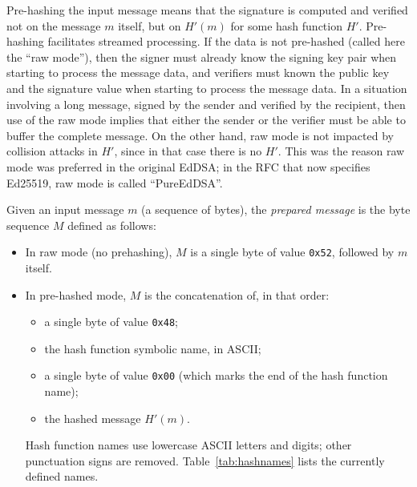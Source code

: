 \documentclass{llncs}
\begin{document}
Pre-hashing the input message means that the signature is computed and
verified not on the message $m$ itself, but on $H'(m)$ for some hash
function $H'$. Pre-hashing facilitates streamed processing. If the data
is not pre-hashed (called here the ``raw mode''), then the signer must
already know the signing key pair when starting to process the message
data, and verifiers must known the public key and the signature value
when starting to process the message data. In a situation involving a
long message, signed by the sender and verified by the recipient, then
use of the raw mode implies that either the sender or the verifier must
be able to buffer the complete message. On the other hand, raw mode is
not impacted by collision attacks in $H'$, since in that case there is
no $H'$. This was the reason raw mode was preferred in the original
EdDSA\cite{BerDuiLanSchYan2012}; in the RFC that now specifies
Ed25519\cite{EdDSArfc8032}, raw mode is called ``PureEdDSA''.

Given an input message $m$ (a sequence of bytes), the \emph{prepared
message} is the byte sequence $M$ defined as follows:
\begin{itemize}

    \item In raw mode (no prehashing), $M$ is a single byte of value
    \verb+0x52+, followed by $m$ itself.

    \item In pre-hashed mode, $M$ is the concatenation of, in that
    order:
    \begin{itemize}

        \item a single byte of value \verb+0x48+;
        \item the hash function symbolic name, in ASCII;
        \item a single byte of value \verb+0x00+ (which marks the end
        of the hash function name);
        \item the hashed message $H'(m)$.

    \end{itemize}
    Hash function names use lowercase ASCII letters and digits;
    other punctuation signs are removed. Table~\ref{tab:hashnames}
    lists the currently defined names.

\end{itemize}
\end{document}
